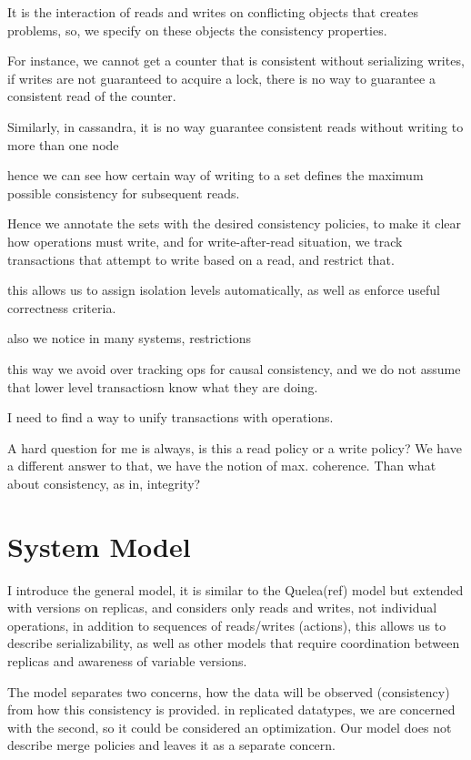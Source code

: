 \documentclass[preprint, numbers]{sigplanconf}
\begin{document}
It is the interaction of reads and writes on conflicting objects that creates
problems, so, we specify on these objects the consistency properties.

For instance, we cannot get a counter that is consistent without serializing
writes, if writes are not guaranteed to acquire a lock, there is no way to
guarantee a consistent read of the counter.

Similarly, in cassandra, it is no way guarantee consistent reads without writing
to more than one node

hence we can see how certain way of writing to a set defines the maximum
possible consistency for subsequent reads. 

Hence we annotate the sets with the desired consistency policies, to make it
clear how operations must write, and for write-after-read situation, we track
transactions that attempt to write based on a read, and restrict that.

this allows us to assign isolation levels automatically, as well as enforce
useful correctness criteria.

also we notice in many systems, restrictions

this way we avoid over tracking ops for causal consistency, and we do not assume
that lower level transactiosn know what they are doing.

I need to find a way to unify transactions with operations.

A hard question for me is always, is this a read policy or a write policy?
We have a different answer to that, we have the notion of max. coherence.
Than what about consistency, as in, integrity?

\section{System Model}
I introduce the general model, it is similar to the Quelea(ref) model but extended
with versions on replicas, and considers only reads and writes, not individual
operations, in addition to sequences of reads/writes (actions), this allows us
to describe serializability, as well as other models that require coordination
between replicas and awareness of variable versions.

The model separates two concerns, how the data will be observed (consistency)
from how this consistency is provided. in replicated datatypes, we are concerned
with the second, so it could be considered an optimization. Our model does not
describe merge policies and leaves it as a separate concern.
\end{document}
